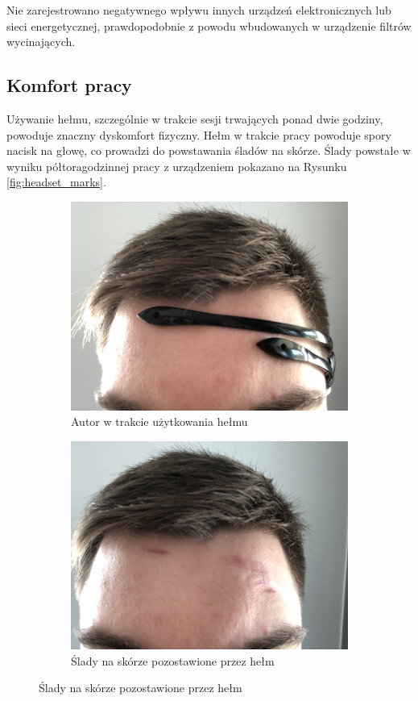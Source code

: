 \documentclass[skorowidz,skroty]{dyplomWEZUT}
\begin{document}
Nie zarejestrowano negatywnego wpływu innych urządzeń elektronicznych lub sieci energetycznej, prawdopodobnie z powodu wbudowanych w urządzenie filtrów wycinających.

\subsection{Komfort pracy}
Używanie hełmu, szczególnie w trakcie sesji trwających ponad dwie godziny, powoduje znaczny dyskomfort fizyczny. Hełm w trakcie pracy powoduje spory nacisk na głowę, co prowadzi do powstawania śladów na skórze. Ślady powstałe w wyniku półtoragodzinnej pracy z urządzeniem pokazano na Rysunku \vref{fig:headset_marks}.

\begin{figure}[htb]
    \begin{subfigure}{0.49\textwidth}
        \includegraphics[width=\linewidth]{graphic/headset_before}
        \caption{Autor w trakcie użytkowania hełmu}
    \end{subfigure}\hspace*{\fill}
    \begin{subfigure}{0.49\textwidth}
        \includegraphics[width=\linewidth]{graphic/headset_after}
        \caption{Ślady na skórze pozostawione przez hełm}
    \end{subfigure}


\end{figure}
\end{document}
